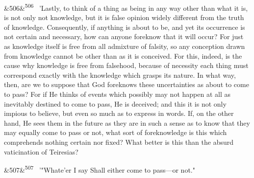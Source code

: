 \documentclass[12pt]{article}
\newcommand{\para}[1][]{\par\noindent\ifx&#1&\else\textsuperscript{\footnotesize #1}~\fi}
\begin{document}
\para[506] 'Lastly, to think of a thing as being in any way other than what it is, is not only not knowledge, but it is false opinion widely different from the truth of knowledge. Consequently, if anything is about to be, and yet its occurrence is not certain and necessary, how can anyone foreknow that it will occur? For just as knowledge itself is free from all admixture of falsity, so any conception drawn from knowledge cannot be other than as it is conceived. For this, indeed, is the cause why knowledge is free from falsehood, because of necessity each thing must correspond exactly with the knowledge which grasps its nature. In what way, then, are we to suppose that God foreknows these uncertainties as about to come to pass? For if He thinks of events which possibly may not happen at all as inevitably destined to come to pass, He is deceived; and this it is not only impious to believe, but even so much as to express in words. If, on the other hand, He sees them in the future as they are in such a sense as to know that they may equally come to pass or not, what sort of foreknowledge is this which comprehends nothing certain nor fixed? What better is this than the absurd vaticination of Teiresias?

\para[507] '"Whate'er I say Shall either come to pass---or not."
\end{document}
